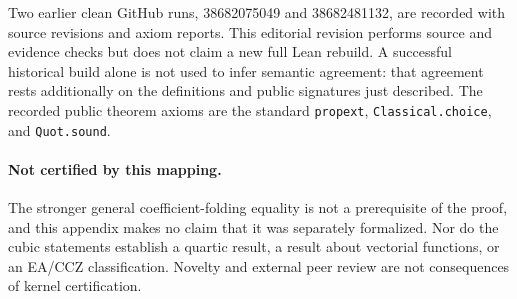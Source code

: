 \documentclass[11pt,a4paper]{article}
\begin{document}
Two earlier clean GitHub runs, 38682075049 and 38682481132, are recorded with source revisions and axiom reports. This editorial revision performs source and evidence checks but does not claim a new full Lean rebuild. A successful historical build alone is not used to infer semantic agreement: that agreement rests additionally on the definitions and public signatures just described. The recorded public theorem axioms are the standard \nolinkurl{propext}, \nolinkurl{Classical.choice}, and \nolinkurl{Quot.sound}.

\paragraph{Not certified by this mapping.}
The stronger general coefficient-folding equality is not a prerequisite of the proof, and this appendix makes no claim that it was separately formalized. Nor do the cubic statements establish a quartic result, a result about vectorial functions, or an EA/CCZ classification. Novelty and external peer review are not consequences of kernel certification.
\end{document}
